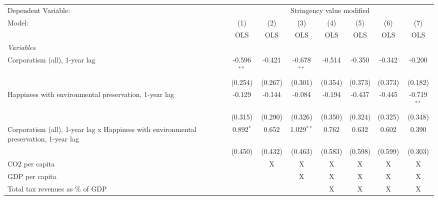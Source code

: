 
\begingroup
\centering
\begin{tabular}{lccccccc}
   \toprule
   Dependent Variable: & \multicolumn{7}{c}{Stringency value modified}\\
   Model:                                                                                & (1)           & (2)     & (3)           & (4)     & (5)     & (6)     & (7)\\  
                                                                                         &  OLS          & OLS     & OLS           & OLS     & OLS     & OLS     & OLS\\  
   \midrule
   \emph{Variables}\\
   Corporatism (all), 1-year lag                                                         & -0.596$^{**}$ & -0.421  & -0.678$^{**}$ & -0.514  & -0.350  & -0.342  & -0.200\\   
                                                                                         & (0.254)       & (0.267) & (0.301)       & (0.354) & (0.373) & (0.373) & (0.182)\\   
   Happiness with environmental preservation, 1-year lag                                 & -0.129        & -0.144  & -0.084        & -0.194  & -0.437  & -0.445  & -0.719$^{**}$\\   
                                                                                         & (0.315)       & (0.290) & (0.326)       & (0.350) & (0.324) & (0.325) & (0.348)\\   
   Corporatism (all), 1-year lag x Happiness with environmental preservation, 1-year lag & 0.892$^{*}$   & 0.652   & 1.029$^{**}$  & 0.762   & 0.632   & 0.602   & 0.390\\   
                                                                                         & (0.450)       & (0.432) & (0.463)       & (0.583) & (0.598) & (0.599) & (0.303)\\   
   CO2 per capita                                                                        &               & X       & X             & X       & X       & X       & X\\  
   GDP per capita                                                                        &               &         & X             & X       & X       & X       & X\\  
   Total tax revenues as \% of GDP                                                       &               &         &               & X       & X       & X       & X\\  

\end{tabular}
